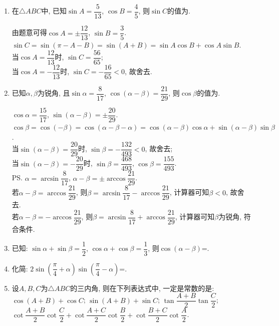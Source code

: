 \begin{enumerate}
\item 在$\triangle{ABC}$中, 已知$\sin{A}=\dfrac{5}{13}$, $\cos{B}=\dfrac{4}{5}$, 则$\sin{C}$的值为. 
\begin{jieda}
由题意可得$\cos{A}=\pm\dfrac{12}{13}$, $\sin{B}=\dfrac{3}{5}$. \\
$\sin{C}=\sin(\pi-A-B)=\sin(A+B)=\sin{A}\cos{B}+\cos{A}\sin{B}$. \\
当$\cos{A}=\dfrac{12}{13}$时, $\sin{C}=\dfrac{56}{65}$; \\
当$\cos{A}=-\dfrac{12}{13}$时, $\sin{C}=-\dfrac{16}{65}<0$, 故舍去. 
\end{jieda}


\item 已知$\alpha,\beta$为锐角, 且$\sin\alpha=\dfrac{8}{17}$, $\cos(\alpha-\beta)=\dfrac{21}{29}$, 
则$\cos\beta$的值为.  %
\begin{jieda}
$\cos\alpha=\dfrac{15}{17}$, $\sin(\alpha-\beta)=\pm\dfrac{20}{29}$. \\
$\cos\beta=\cos(-\beta)=\cos(\alpha-\beta-\alpha)=\cos(\alpha-\beta)\cos\alpha+\sin(\alpha-\beta)\sin\beta$. \\
当$\sin(\alpha-\beta)=\dfrac{20}{29}$时, $\sin\beta=-\dfrac{132}{493}<0$, 故舍去; \\ %
当$\sin(\alpha-\beta)=-\dfrac{20}{29}$时, $\sin\beta=\dfrac{468}{493}$, $\cos\beta=\dfrac{155}{493}$. \\
\ps $\alpha=\arcsin\dfrac{8}{17}$, $\alpha-\beta=\pm\arccos\dfrac{21}{29}$. \\
若$\alpha-\beta=\arccos\dfrac{21}{29}$, 则$\beta=\arcsin\dfrac{8}{17}-\arccos\dfrac{21}{29}$, 计算器可知$\beta<0$, 故舍去. \\
若$\alpha-\beta=-\arccos\dfrac{21}{29}$, 则$\beta=\arcsin\dfrac{8}{17}+\arccos\dfrac{21}{29}$, 计算器可知$\beta$为锐角, 符合条件. 
\end{jieda}

\item 已知: $\sin\alpha+\sin\beta=\dfrac{1}{2}$, $\cos\alpha+\cos\beta=\dfrac{1}{3}$, 则$\cos(\alpha-\beta)$=. 

\item 化简: $2\sin\left(\dfrac{\pi}{4}+\alpha\right)\sin\left(\dfrac{\pi}{4}-\alpha\right)$=. 

\item 设$A,B,C$为$\triangle{ABC}$的三内角, 则在下列表达式中, 一定是常数的是: \\
 $\cos(A+B)+\cos{C}$;
 $\sin(A+B)+\sin{C}$;
 $\tan\dfrac{A+B}{2}\tan\dfrac{C}{2}$;
 $\cot\dfrac{A+B}{2}\cot\dfrac{C}{2}+\cot\dfrac{A+C}{2}\cot\dfrac{B}{2}+\cot\dfrac{B+C}{2}\cot\dfrac{A}{2}$. 


\end{enumerate}
